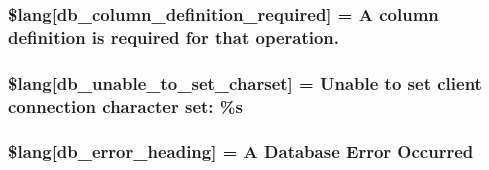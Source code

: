 \subsubsection[{\$lang}]{\setlength{\rightskip}{0pt plus 5cm}\$lang\mbox{[}\textquotesingle{}db\+\_\+column\+\_\+definition\+\_\+required\textquotesingle{}\mbox{]} = \textquotesingle{}A column definition is required for that operation.\textquotesingle{}}\label{db__lang_8php_ad0ba270704ec81f8f89e486a18660354}
\hypertarget{db__lang_8php_ab22396948e25460833329cb8786ad831}{}
\subsubsection[{\$lang}]{\setlength{\rightskip}{0pt plus 5cm}\$lang\mbox{[}\textquotesingle{}db\+\_\+unable\+\_\+to\+\_\+set\+\_\+charset\textquotesingle{}\mbox{]} = \textquotesingle{}Unable to set client connection character set\+: \%s\textquotesingle{}}\label{db__lang_8php_ab22396948e25460833329cb8786ad831}
\hypertarget{db__lang_8php_a4be34cea2490b0d41689b65e52286658}{}
\subsubsection[{\$lang}]{\setlength{\rightskip}{0pt plus 5cm}\$lang\mbox{[}\textquotesingle{}db\+\_\+error\+\_\+heading\textquotesingle{}\mbox{]} = \textquotesingle{}A Database Error Occurred\textquotesingle{}}\label{db__lang_8php_a4be34cea2490b0d41689b65e52286658}
